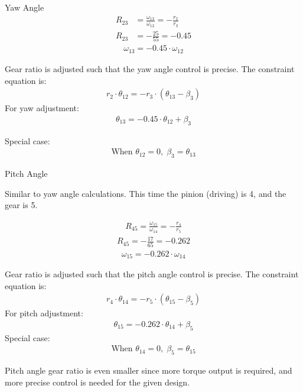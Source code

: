 \documentclass[12pt]{report}
\begin{document}
Yaw Angle
\begin{align}
    R_{23} &= \frac{\omega_{13}}{\omega_{12}} = -\frac{r_2}{r_3} \\
    R_{23} &= -\frac{25}{55} = -0.45
\end{align}
\begin{align}
    \omega_{13} = -0.45 \cdot \omega_{12}
\end{align}


Gear ratio is adjusted such that the yaw angle control is precise. The constraint equation is:
\begin{align}
r_2 \cdot \theta_{12} = -r_3 \cdot (\theta_{13} - \beta_3)
\end{align}
For yaw adjustment:
\begin{align}
    \theta_{13} = -0.45 \cdot \theta_{12} + \beta_3
\end{align}

Special case:
\begin{align}
\text{When } \theta_{12} = 0, \; \beta_3 = \theta_{13}
\end{align}

Pitch Angle

Similar to yaw angle calculations. This time the pinion (driving) is 4, and the gear is 5.

\begin{align}
R_{45} = \frac{\omega_{15}}{\omega_{14}} = -\frac{r_4}{r_5}
\end{align}
\begin{align}
R_{45} = -\frac{17}{65} = -0.262
\end{align}
\begin{align}
\omega_{15} = -0.262 \cdot \omega_{14}
\end{align}

Gear ratio is adjusted such that the pitch angle control is precise. The constraint equation is:
\begin{align}
r_4 \cdot \theta_{14} = -r_5 \cdot (\theta_{15} - \beta_5)
\end{align}
For pitch adjustment:
\begin{align}
\theta_{15} = -0.262 \cdot \theta_{14} + \beta_5
\end{align}
Special case:
\begin{align}
\text{When } \theta_{14} = 0, \; \beta_5 = \theta_{15}
\end{align}

Pitch angle gear ratio is even smaller since more torque output is required, and more precise control is needed for the given design.
\end{document}
